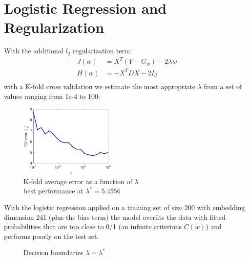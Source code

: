 \documentclass{acmsiggraph}
\begin{document}
\section{Logistic Regression and Regularization}
With the additional $l_2$ regularization term:
\[\begin{split}
J(w) & = X^T(Y-G_w) - 2\lambda w\\
H(w) & = -X^TDX -2I_d \\
\end{split}\]
with a K-fold cross validation we estimate the most appropriate $\lambda$ from a set of values ranging from 1e-4 to 100:
\begin{figure}[H]
\centering
\includegraphics[height=3.6cm]{cv_error}
\caption*{K-fold average error as a function of $\lambda$\\ best performance at $\lambda^* = 5.4556$}
\end{figure}
With the logistic regression applied on a training set of size 200 with embedding dimension 241 (plus the bias term) the model overfits the data with fitted probabilities that are too close to 0/1 (an infinite criterions $C(w)$) and performs poorly on the test set.
\begin{figure}[H]
\centering
{}
\hspace{5pt}
\caption*{Decision boundaries $\lambda = \lambda^*$}
\end{figure}
\end{document}
